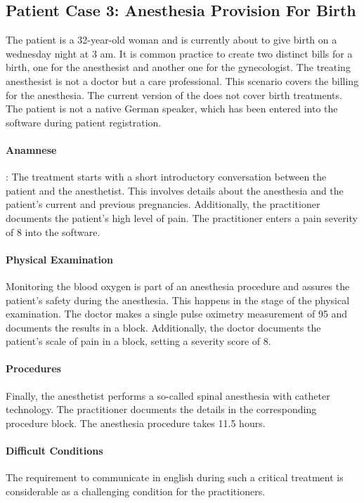 \subsection{Patient Case 3: Anesthesia Provision For Birth}\label{subsec:patient-case-3:-anesthesia-for-birth}
The patient is a 32-year-old woman and is currently about to give birth on a wednesday night at 3 am.
It is common practice to create two distinct bills for a birth, one for the anesthesist and another one for the gynecologist.
The treating anesthesist is not a doctor but a care professional.
This scenario covers the billing for the anesthesia.
The current version of the \AVS does not cover birth treatments.
The patient is not a native German speaker, which has been entered into the software during patient registration.

\paragraph{Anamnese}:
The treatment starts with a short introductory conversation between the patient and the anesthetist.
This involves details about the anesthesia and the patient's current and previous pregnancies.
Additionally, the practitioner documents the patient's high level of pain.
The practitioner enters a pain severity of 8 into the software.

\paragraph{Physical Examination}
Monitoring the blood oxygen is part of an anesthesia procedure and assures the patient's safety during the anesthesia.
This happens in the stage of the physical examination.
The doctor makes a single pulse oximetry measurement of 95 and documents the results in a  block.
Additionally, the doctor documents the patient's scale of pain in a  block,
setting a severity score of 8.

\paragraph{Procedures}
Finally, the anesthetist performs a so-called spinal anesthesia with catheter technology.
The practitioner documents the details in the corresponding  procedure block.
The anesthesia procedure takes 11.5 hours.

\paragraph{Difficult Conditions}
The requirement to communicate in english during such a critical treatment is considerable as a challenging condition for the practitioners.

